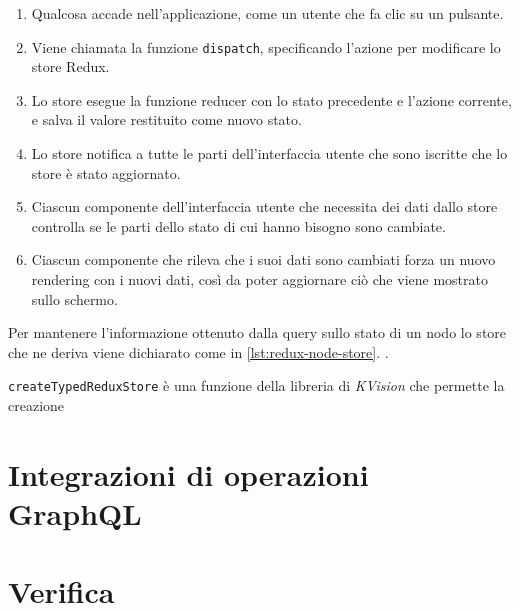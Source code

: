 \begin{enumerate}	
	\item Qualcosa accade nell'applicazione, come un utente che fa clic su un pulsante.
	\item Viene chiamata la funzione \texttt{dispatch}, specificando l'azione per modificare lo store Redux.
	\item Lo store esegue la funzione reducer con lo stato precedente e l'azione corrente, e salva il valore restituito come nuovo stato.
	\item Lo store notifica a tutte le parti dell'interfaccia utente che sono iscritte che lo store è stato aggiornato.
	\item Ciascun componente dell'interfaccia utente che necessita dei dati dallo store controlla se le parti dello stato di cui hanno bisogno sono cambiate.
	\item Ciascun componente che rileva che i suoi dati sono cambiati forza un nuovo rendering con i nuovi dati, così da poter aggiornare ciò che viene mostrato sullo schermo.
\end{enumerate}
Per mantenere l'informazione ottenuto dalla query sullo stato di un nodo lo store che ne deriva viene dichiarato come in \cref{lst:redux-node-store}.
.

\texttt{createTypedReduxStore} è una funzione della libreria di \textit{KVision} che permette la creazione

\section{Integrazioni di operazioni GraphQL}

\section{Verifica}